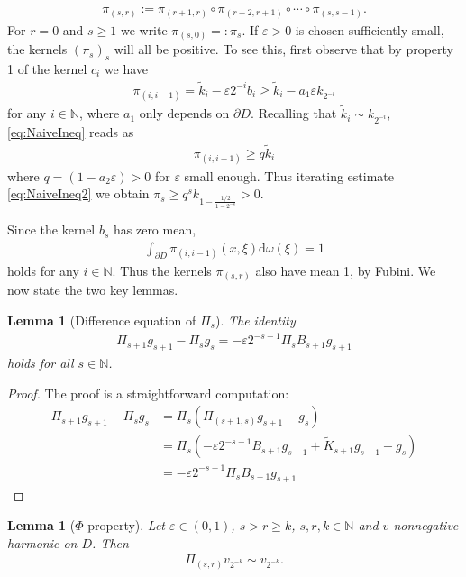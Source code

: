 \documentclass[a4paper,12pt]{article}
\newtheorem{lemma}[theorem]{Lemma}
\theoremstyle{definition}
\theoremstyle{definition}
\begin{document}
		\begin{align*}
			\pi_{(s,r)}:=\pi_{(r+1,r)}\circ\pi_{(r+2,r+1)}\circ\cdots\circ\pi_{(s,s-1)}.
		\end{align*}
		For $r=0$ and $s\geq1$ we write $\pi_{(s,0)}=:\pi_s$. If $\varepsilon>0$ is chosen sufficiently small, the kernels $(\pi_s)_s$ will all be positive. To see this, first observe that by property 1 of the kernel $c_i$ we have
		\begin{align}\label{eq:NaiveIneq}
				\pi_{(i,i-1)}= \tilde k_i -\varepsilon 2^{-i}b_i\geq \tilde k_i -a_1\varepsilon k_{2^{-i}} 
		\end{align}
		for any $i\in\mathbb{N}$, where $a_1$ only depends on ${\partial D}$. Recalling that $\tilde k_i\sim k_{2^{-i}}$, \eqref{eq:NaiveIneq} reads as
		\begin{align}\label{eq:NaiveIneq2}
			\pi_{(i,i-1)}\geq q\tilde k_i
		\end{align}
		where $q=(1-a_2\varepsilon)>0$ for $\varepsilon$ small enough. Thus iterating estimate \eqref{eq:NaiveIneq2} we obtain $\pi_{s}\geq q^{s}k_{1-\frac{1/2}{1 -2^{-s}}}>0$.\par
		Since the kernel $b_s$ has zero mean,
		\begin{align*}
			\int_{\partial D}\pi_{(i,i-1)}(x,\xi)\mathrm d\omega(\xi)=1
		\end{align*}
		holds for any $i\in\mathbb N$. Thus the kernels $\pi_{(s,r)}$ also have mean 1, by Fubini.
		We now state the two key lemmas.
		\begin{lemma}[Difference equation of $\Pi_{s}$]
		\label{lem:diff_eq} The identity
		\begin{align*}
			\Pi_{s+1}g_{s+1}-\Pi_{s} g_s = -\varepsilon 2^{-s-1}\Pi_{s} B_{s+1} g_{s+1}
		\end{align*}
		holds for all $s\in\mathbb N$.
		\end{lemma}
		\begin{proof}
			The proof is a straightforward computation:
			\begin{align*}
				\Pi_{s+1}g_{s+1}-\Pi_{s} g_s &= \Pi_{s}\left(\Pi_{(s+1,s)}g_{s+1}-g_s\right)\\
				&=\Pi_{s}\left(-\varepsilon 2^{-s-1}B_{s+1}g_{s+1}+\tilde K_{s+1}g_{s+1}-g_s\right)\\
				&=-\varepsilon 2^{-s-1} \Pi_{s} B_{s+1} g_{s+1}
			\end{align*}
		\end{proof}
		\begin{lemma}[$\Phi$-property]
			\label{lem:phi-prop}
			Let $\varepsilon\in(0,1)$, $s>r\geq k$, $s,r,k\in\mathbb{N}$ and $v$ nonnegative harmonic on $ D$. Then
			\begin{align*}
				\Pi_{(s,r)}v_{2^{-k}}\sim v_{2^{-k}}.
			\end{align*}
		\end{lemma}
\end{document}
